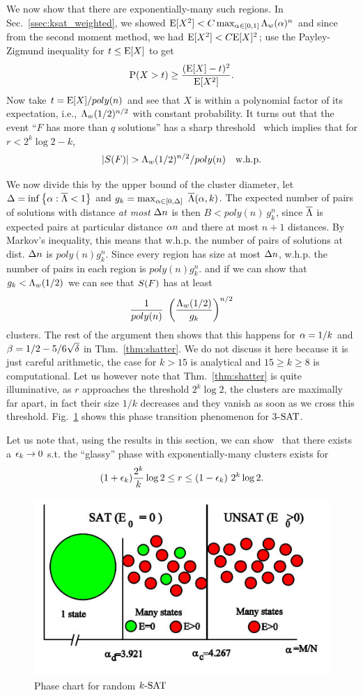 \documentclass[letterpaper, 10pt, twocolumn, reqno]{amsart}
\begin{document}
We now show that there are exponentially-many such regions. In Sec.~\ref{ssec:ksat_weighted}, we showed $\E[X^2] < C \max_{\a \in [0,1]} \L_w(\a)^n$ and since from the second moment method, we had $\E[X^2] < C \E[X]^2$; use the Payley-Zigmund inequality for $t \leq \E[X]$ to get
$$
\P(X > t) \geq \f{(\E[X]-t)^2}{\E[X^2]}.
$$
Now take $t = \E[X]/poly(n)$ and see that $X$ is within a polynomial factor of its expectation, i.e., $\L_w(1/2)^{n/2}$ with constant probability. It turns out that the event ``$F$ has more than $q$ solutions'' has a sharp threshold~\cite{achlioptas2008algorithmic} which implies that for $r < 2^k \log 2 - k$,
$$\abs{\sf} > \L_w(1/2)^{n/2}/poly(n) \quad \trm{w.h.p.}$$

We now divide this by the upper bound of the cluster diameter, let $\D = \inf \cbrac{\a: \bL < 1}$ and $g_k = \max_{\a \in [0,\D]}\ \bL(\a,k)$. The expected number of pairs of solutions with distance \emph{at most} $\D n$ is then $B < poly(n)\ g_k^n$, since $\bL$ is expected pairs at particular distance $\a n$ and there at most $n+1$ distances. By Markov's inequality, this means that w.h.p. the number of pairs of solutions at dist. $\D n$ is $poly(n) g_k^n$. Since every region has size at most $\D n$, w.h.p. the number of pairs in each region is $poly(n) g_k^n$. and if we can show that $g_k < \L_w(1/2)$ we can see that $\sf$ has at least
$$
\f{1}{poly(n)}\ \rbrac{\f{\L_w(1/2)}{g_k}}^{n/2}
$$
clusters. The rest of the argument then shows that this happens for $\a = 1/k$ and $\b = 1/2 - 5/6\sqrt{\d}$ in Thm.~\ref{thm:shatter}. We do not discuss it here because it is just careful arithmetic, the case for $k > 15$ is analytical and $15 \geq k \geq 8$ is computational. Let us however note that Thm.~\ref{thm:shatter} is quite illuminative, as $r$ approaches the threshold $2^k \log 2$, the clusters are maximally far apart, in fact their size $1/k$ decreases and they vanish as soon as we cross this threshold. Fig.~\ref{fig:phase_chart} shows this phase transition phenomenon for 3-$\SAT$.

Let us note that, using the results in this section, we can show~\cite{achlioptas2008algorithmic} that there exists a $\e_k \to 0$ s.t. the ``glassy'' phase with exponentially-many clusters exists for
$$
(1 +\e_k) \f{2^k}{k} \log 2 \leq r \leq (1-\e_k)\ 2^k \log 2.
$$

\begin{figure}
\centering
\includegraphics[width=.7\columnwidth]{phase_chart.jpg}
\caption{Phase chart for random $\ksat$}
\label{fig:phase_chart}
\end{figure}
\end{document}
